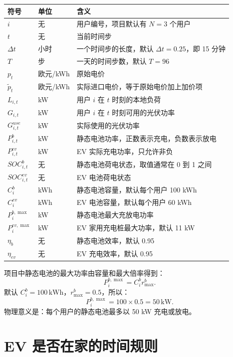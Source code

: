 \documentclass[UTF8,zihao=-4]{ctexart}
\begin{document}
\begin{longtable}{>{\centering\arraybackslash}p{3.2cm}p{4.2cm}p{7.0cm}}
\toprule
符号 & 单位 & 含义 \\
\midrule
\endhead
$i$ & 无 & 用户编号，项目默认有 $N=3$ 个用户 \\
$t$ & 无 & 当前时间步 \\
$\Delta t$ & 小时 & 一个时间步的长度，默认 $\Delta t=0.25$，即 15 分钟 \\
$T$ & 步 & 一天的时间步数，默认 $T=96$ \\
$p_t$ & 欧元/kWh & 原始电价 \\
$\tilde p_t$ & 欧元/kWh & 实际进口电价，等于原始电价加上加价项 \\
$L_{i,t}$ & kW & 用户 $i$ 在 $t$ 时刻的本地负荷 \\
$G_{i,t}$ & kW & 用户 $i$ 在 $t$ 时刻可用的光伏功率 \\
$G^{use}_{i,t}$ & kW & 实际使用的光伏功率 \\
$P^b_{i,t}$ & kW & 静态电池功率，正数表示充电，负数表示放电 \\
$P^{ev}_{i,t}$ & kW & EV 实际充电功率，只允许非负 \\
$SOC^b_{i,t}$ & 无 & 静态电池荷电状态，取值通常在 0 到 1 之间 \\
$SOC^{ev}_{i,t}$ & 无 & EV 电池荷电状态 \\
$C^b_i$ & kWh & 静态电池容量，默认每个用户 100 kWh \\
$C^{ev}_i$ & kWh & EV 电池容量，默认每个用户 60 kWh \\
$P^{b,\max}_i$ & kW & 静态电池最大充放电功率 \\
$P^{ev,\max}_i$ & kW & EV 家用充电桩最大功率，默认 11 kW \\
$\eta_b$ & 无 & 静态电池效率，默认 0.95 \\
$\eta_{ev}$ & 无 & EV 充电效率，默认 0.95 \\
\bottomrule
\end{longtable}

项目中静态电池的最大功率由容量和最大倍率得到：
\begin{equation}
P^{b,\max}_i=C^b_i r^b_{\max}.
\end{equation}
默认 $C^b_i=100\,\mathrm{kWh}$，$r^b_{\max}=0.5$，所以：
\begin{equation}
P^{b,\max}_i=100\times 0.5=50\,\mathrm{kW}.
\end{equation}
物理意义是：每个用户的静态电池最多以 50 kW 充电或放电。

\section{EV 是否在家的时间规则}
\end{document}
